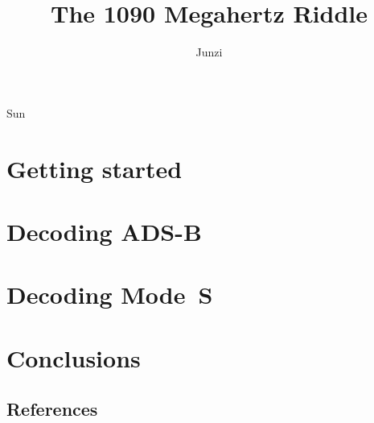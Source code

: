 \documentclass[openany]{r1090}                %
\date{}
\newcommand\1{\texttt{1}}
\newcommand\0{\texttt{0}}
\begin{document}
\title[A Guide to Decoding and Interpreting ADS-B and Other Mode S Signals]{The 1090 Megahertz Riddle}
\author{Junzi}{Sun}





\dedication{
  This book is dedicated to my sons: William and Vincent
}

\setcounter{tocdepth}{1}
\tableofcontents



\part{Getting started}



\part{Decoding ADS-B}









\part{Decoding Mode~S}










\part{Conclusions}



\chapter*{References}
\printbibliography[heading=none]




\end{document}
